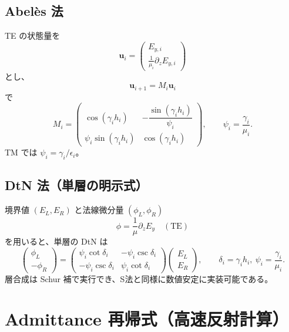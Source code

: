 \documentclass[a4paper,11pt]{article}
\begin{document}
\subsection{Abel\`es 法}
TE の状態量を
\begin{equation}
\bm{u}_i=
\begin{pmatrix}
E_{y,i}\\
\frac{1}{\mu_i}\partial_z E_{y,i}
\end{pmatrix}
\end{equation}
とし、
\begin{equation}
\bm{u}_{i+1}=M_i\bm{u}_i
\end{equation}
で
\begin{equation}
M_i=
\begin{pmatrix}
\cos(\gamma_i h_i) & -\dfrac{\sin(\gamma_i h_i)}{\psi_i}\\[4pt]
\psi_i\sin(\gamma_i h_i) & \cos(\gamma_i h_i)
\end{pmatrix},
\qquad
\psi_i=\frac{\gamma_i}{\mu_i}.
\end{equation}
TM では $\psi_i=\gamma_i/\epsilon_i$。

\subsection{DtN 法（単層の明示式）}
境界値 $\left(E_L,E_R\right)$ と法線微分量 $\left(\phi_L,\phi_R\right)$
\begin{equation}
\phi=\frac{1}{\mu}\partial_z E_y \quad (\text{TE})
\end{equation}
を用いると、単層の DtN は
\begin{equation}
\begin{pmatrix}
\phi_L\\
-\phi_R
\end{pmatrix}
=
\begin{pmatrix}
\psi_i\cot\delta_i & -\psi_i\csc\delta_i\\
-\psi_i\csc\delta_i & \psi_i\cot\delta_i
\end{pmatrix}
\begin{pmatrix}
E_L\\
E_R
\end{pmatrix},
\qquad
\delta_i=\gamma_i h_i,\ \psi_i=\frac{\gamma_i}{\mu_i}.
\end{equation}
層合成は Schur 補で実行でき、S法と同様に数値安定に実装可能である。

\section{Admittance 再帰式（高速反射計算）}
\end{document}
